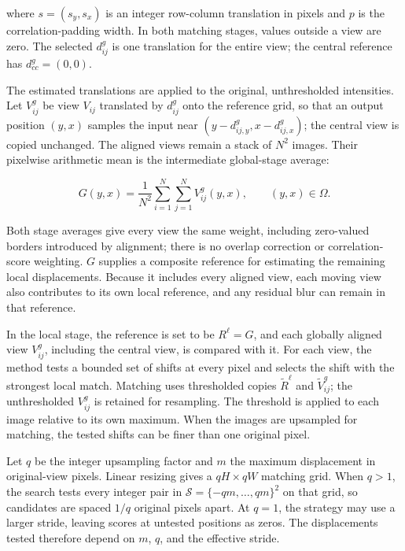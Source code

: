 where $s=(s_y,s_x)$ is an integer row-column translation in pixels and $p$ is the correlation-padding width. In both matching stages, values outside a view are zero. The selected $d^g_{ij}$ is one translation for the entire view; the central reference has $d^g_{cc}=(0,0)$.

The estimated translations are applied to the original, unthresholded intensities. Let $V^g_{ij}$ be view $V_{ij}$ translated by $d^g_{ij}$ onto the reference grid, so that an output position $(y,x)$ samples the input near $(y-d^g_{ij,y},x-d^g_{ij,x})$; the central view is copied unchanged. The aligned views remain a stack of $N^2$ images. Their pixelwise arithmetic mean is the intermediate global-stage average:

\begin{equation}
    G(y,x)=\frac{1}{N^2}\sum_{i=1}^{N}\sum_{j=1}^{N}V^g_{ij}(y,x),\qquad (y,x)\in\Omega.
\end{equation}

Both stage averages give every view the same weight, including zero-valued borders introduced by alignment; there is no overlap correction or correlation-score weighting. $G$ supplies a composite reference for estimating the remaining local displacements. Because it includes every aligned view, each moving view also contributes to its own local reference, and any residual blur can remain in that reference.

In the local stage, the reference is set to be $R^\ell=G$, and each globally aligned view $V^g_{ij}$, including the central view, is compared with it. For each view, the method tests a bounded set of shifts at every pixel and selects the shift with the strongest local match. Matching uses thresholded copies $\widetilde R^\ell$ and $\widetilde V^g_{ij}$; the unthresholded $V^g_{ij}$ is retained for resampling. The threshold is applied to each image relative to its own maximum. When the images are upsampled for matching, the tested shifts can be finer than one original pixel.

Let $q$ be the integer upsampling factor and $m$ the maximum displacement in original-view pixels. Linear resizing gives a $qH\times qW$ matching grid. When $q>1$, the search tests every integer pair in $\mathcal S=\{-qm,\ldots,qm\}^{2}$ on that grid, so candidates are spaced $1/q$ original pixels apart. At $q=1$, the strategy may use a larger stride, leaving scores at untested positions as zeros. The displacements tested therefore depend on $m$, $q$, and the effective stride.

